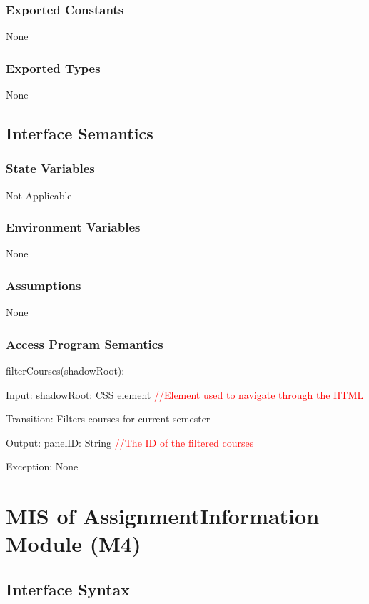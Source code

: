 \documentclass[12pt, titlepage]{article}
\begin{document}
\subsubsection{Exported Constants}
None
\subsubsection{Exported Types}
None
\subsection{Interface Semantics}
\subsubsection{State Variables}
Not Applicable
\subsubsection{Environment Variables}
None
\subsubsection{Assumptions}
None
\subsubsection{Access Program Semantics}
filterCourses(shadowRoot):
    
    Input: shadowRoot: CSS element \textcolor{red}{//Element used to navigate through the HTML}

    Transition: Filters courses for current semester
    
    Output: panelID: String \textcolor{red}{//The ID of the filtered courses}

    Exception: None


\newpage

\section{MIS of AssignmentInformation Module (M4)}
\subsection{Interface Syntax}
\end{document}
